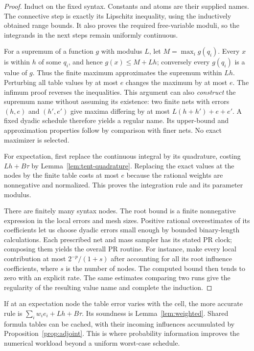 \begin{proof}
Induct on the fixed syntax. Constants and atoms are their supplied names.
The connective step is exactly its Lipschitz inequality, using the
inductively obtained range bounds. It also proves the required free-variable
moduli, so the integrands in the next steps remain uniformly continuous.

For a supremum of a function $g$ with modulus $L$, let
$M=\max_i g(q_i)$. Every $x$ is within $h$ of some $q_i$, and hence
$g(x)\le M+Lh$; conversely every $g(q_i)$ is a value of $g$. Thus the
finite maximum approximates the supremum within $Lh$. Perturbing all
table values by at most $e$ changes the maximum by at most $e$.
The infimum proof reverses the inequalities. This argument can also
\emph{construct} the supremum name without assuming its existence:
two finite nets with errors $(h,e)$ and $(h',e')$ give maxima differing by
at most $L(h+h')+e+e'$. A fixed dyadic schedule therefore yields a regular
name. Its upper-bound and approximation properties follow by comparison
with finer nets. No exact maximizer is selected.

For expectation, first replace the continuous integral by its quadrature,
costing $Lh+B\tau$ by Lemma~\ref{lem:tent-quadrature}. Replacing the
exact values at the nodes by the finite table costs at most $e$ because
the rational weights are nonnegative and normalized. This proves the
integration rule and its parameter modulus.

There are finitely many syntax nodes. The root bound is a finite
nonnegative expression in the local errors and mesh sizes. Positive
rational overestimates of its coefficients let us choose dyadic errors
small enough by bounded binary-length calculations. Each prescribed net
and mass sampler has its stated PR clock; composing them yields the
overall PR routine. For instance, make every local contribution at most
$2^{-p}/(1+s)$ after accounting for all its root influence coefficients,
where $s$ is the number of nodes. The computed bound then tends to zero
with an explicit rate. The same estimates comparing two runs give the
regularity of the resulting value name and complete the induction.
\end{proof}

If at an expectation node the table error varies with the cell, the more
accurate rule is
$\sum_iw_i e_i+Lh+B\tau$. Its soundness is
Lemma~\ref{lem:weighted}. Shared formula tables can be cached, with
their incoming influences accumulated by
Proposition~\ref{prop:adjoint}. This is where probability information
improves the numerical workload beyond a uniform worst-case schedule.

